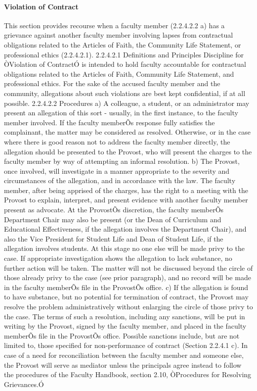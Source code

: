 \documentclass[letterpaper, 11pt]{article}
\begin{document}
			\paragraph{Violation of Contract}
				This section provides recourse when a faculty member (2.2.4.2.2 a) has a grievance against another faculty member involving lapses from contractual obligations related to the Articles of Faith, the Community Life Statement, or professional ethics (2.2.4.2.1).
				2.2.4.2.1 Definitions and Principles
				Discipline for ÒViolation of ContractÓ is intended to hold faculty accountable for contractual obligations related to the Articles of Faith, Community Life Statement, and professional ethics.  For the sake of the accused faculty member and the community, allegations about such violations are best kept confidential, if at all possible.
				2.2.4.2.2 Procedures
				a) A colleague, a student, or an administrator may present an allegation of this sort - usually, in the first instance, to the faculty member involved.  If the faculty memberÕs response fully satisfies the complainant, the matter may be considered as resolved.  Otherwise, or in the case where there is good reason not to address the faculty member directly, the allegation should be presented to the Provost, who will present the charges to the faculty member by way of attempting an informal resolution.
				b) The Provost, once involved, will investigate in a manner appropriate to the severity and circumstances of the allegation, and in accordance with the law.  The faculty member, after being apprised of the charges, has the right to a meeting with the Provost to explain, interpret, and present evidence with another faculty member present as advocate.  At the ProvostÕs discretion, the faculty memberÕs Department Chair may also be present (or the Dean of Curriculum and Educational Effectiveness, if the allegation involves the Department Chair), and also the Vice President for Student Life and Dean of Student Life, if the allegation involves students.  At this stage no one else will be made privy to the case.
				If appropriate investigation shows the allegation to lack substance, no further action will be taken.  The matter will not be discussed beyond the circle of those already privy to the case (see prior paragraph), and no record will be made in the faculty memberÕs file in the ProvostÕs office.
				c) If the allegation is found to have substance, but no potential for termination of contract, the Provost may resolve the problem administratively without enlarging the circle of those privy to the case.  The terms of such a resolution, including any sanctions, will be put in writing by the Provost, signed by the faculty member, and placed in the faculty memberÕs file in the ProvostÕs office.  Possible sanctions include, but are not limited to, those specified for non-performance of contract (Section 2.2.4.1 c).  In case of a need for reconciliation between the faculty member and someone else, the Provost will serve as mediator unless the principals agree instead to follow the procedures of the Faculty Handbook, section 2.10, ÒProcedures for Resolving Grievances.Ó
\end{document}

